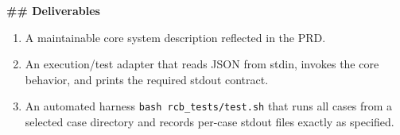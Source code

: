 \begin{promptbox}
\textbf{\#\# Deliverables}
\begin{enumerate}
\item A maintainable core system description reflected in the PRD.
\item An execution/test adapter that reads JSON from stdin, invokes the core behavior, and prints the required stdout contract.
\item An automated harness \texttt{bash rcb\_tests/test.sh} that runs all cases from a selected case directory and records per-case stdout files exactly as specified.
\end{enumerate}
\end{promptbox}
